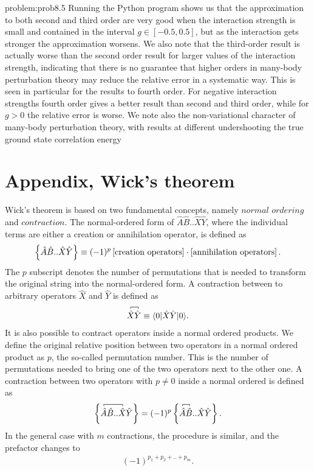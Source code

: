 \begin{sol}{problem:prob8.5}
Running the Python program shows us that
the approximation to both second and third order are very
good when the interaction strength is small and contained in the interval
$g\in[-0.5,0.5]$, but as the
interaction gets stronger the approximation worsens. We also
note that the third-order result is actually worse than the second order result
for larger values of the interaction strength, indicating that there is no guarantee that higher orders
in many-body perturbation theory may reduce the relative error in a systematic way.
This is seen in particular for the results to fourth order. For negative interaction strengths
fourth order gives a better result than second and third order, while for $g>0$ the relative error is
worse.
We note also the non-variational character of many-body perturbation theory, with results at different undershooting the true ground state correlation energy
\end{sol}


\section*{Appendix, Wick's theorem}
Wick's theorem is based on two fundamental concepts, namely $\textit{normal ordering}$ and $\textit{contraction}$. The normal-ordered form of $\hat{A}\hat{B}..\hat{X}\hat{Y}$, where the individual terms are either a creation or annihilation operator, is defined as
\begin{align}
\label{def: Normal ordering}
\kpr{\hat{A}\hat{B}..\hat{X}\hat{Y}} \equiv (-1)^p\fpr{\text{creation operators}}\cdot\fpr{\text{annihilation operators}}.
\end{align}
The $p$ subscript denotes the number of permutations that is needed to transform the original string into the normal-ordered form. A contraction between to arbitrary operators $\hat{X}$ and $\hat{Y}$ is defined as  
\begin{align}
\contraction[0.5ex]{}{\hat{X}}{}{\hat{Y}}{} 
\hat{X}\hat{Y}  \equiv \for{0}{\hat{X}\hat{Y}}{0}.
\end{align}
It is also possible to contract operators inside a normal ordered products. We define the  original relative position between two operators in a normal ordered product as $p$, the so-called permutation number. This is the number of permutations needed to bring one of the two operators next to the other one. A contraction between two operators with $p \neq 0$ inside a normal ordered is defined as
\begin{align}
\kpr{\contraction[0.5ex]{}{\hat{A}}{\hat{B}..}{\hat{X}}\hat{A}\hat{B}..\hat{X}\hat{Y}} = (-1)^p \kpr{\contraction[0.5ex]{}{\hat{A}}{}{\hat{B}}\hat{A}\hat{B}..\hat{X}\hat{Y}}.
\end{align}
In the general case with $m$ contractions, the procedure is similar, and the prefactor changes to 
\begin{align}
(-1)^{p_1 + p_2 + .. + p_m}.
\end{align} 

